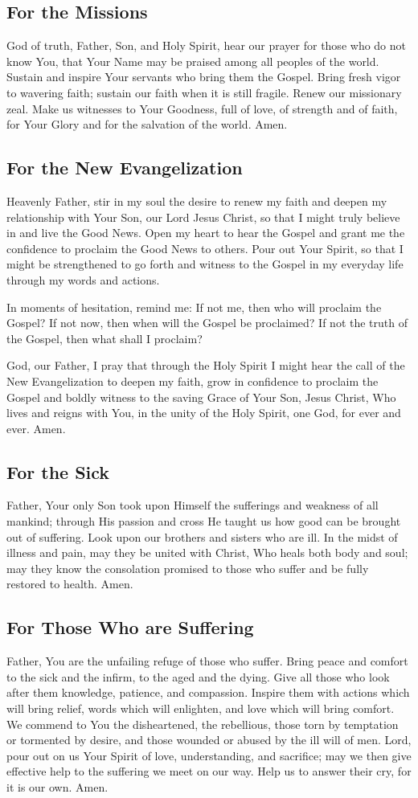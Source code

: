 \documentclass[12pt]{article}
\newcommand{\prayertitle}[1]{\subsection{#1}}
\begin{document}
\prayertitle{For the Missions}
God of truth, Father, Son, and Holy Spirit, hear our prayer for those who do not know You, that Your Name may be praised among all peoples of the world.
Sustain and inspire Your servants who bring them the Gospel.
Bring fresh vigor to wavering faith; sustain our faith when it is still fragile.
Renew our missionary zeal.
Make us witnesses to Your Goodness, full of love, of strength and of faith, for Your Glory and for the salvation of the world.
Amen.
\newpage
\prayertitle{For the New Evangelization}
\label{prayer:new_evangelization}
Heavenly Father, stir in my soul the desire to renew my faith and deepen my relationship with Your Son, our Lord Jesus Christ, so that I might truly believe in and live the Good News.   
Open my heart to hear the Gospel and grant me the confidence to proclaim the Good News to others.
Pour out Your Spirit, so that I might be strengthened to go forth and witness to the Gospel in my everyday life through my words and actions.  

In moments of hesitation, remind me:
If not me, then who will proclaim the Gospel?
If not now, then when will the Gospel be proclaimed?
If not the truth of the Gospel, then what shall I proclaim?

God, our Father, I pray that through the Holy Spirit I might hear the call of the New Evangelization to deepen my faith, grow in confidence to proclaim the Gospel and boldly witness to the saving Grace of Your Son, Jesus Christ, Who lives and reigns with You, in the unity of the Holy Spirit, one God, for ever and ever.
Amen.

\prayertitle{For the Sick}
Father, Your only Son took upon Himself the sufferings and weakness of all mankind; through His passion and cross He taught us how good can be brought out of suffering.
Look upon our brothers and sisters who are ill.
In the midst of illness and pain, may they be united with Christ, Who heals both body and soul; may they know the consolation promised to those who suffer and be fully restored to health.
Amen.

\prayertitle{For Those Who are Suffering}
Father, You are the unfailing refuge of those who suffer.
Bring peace and comfort to the sick and the infirm, to the aged and the dying.
Give all those who look after them knowledge, patience, and compassion.
Inspire them with actions which will bring relief, words which will enlighten, and love which will bring comfort.
We commend to You the disheartened, the rebellious, those torn by temptation or tormented by desire, and those wounded or abused by the ill will of men.
Lord, pour out on us Your Spirit of love, understanding, and sacrifice; may we then give effective help to the suffering we meet on our way.
Help us to answer their cry, for it is our own.
Amen.
\end{document}
